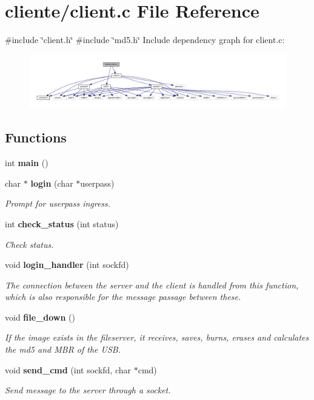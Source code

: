 \section{cliente/client.c File Reference}
\label{client_8c}
{\ttfamily \#include \char`\"{}client.\+h\char`\"{}}\newline
{\ttfamily \#include \char`\"{}md5.\+h\char`\"{}}\newline
Include dependency graph for client.\+c\+:
\nopagebreak
\begin{figure}[H]
\begin{center}
\leavevmode
\includegraphics[width=350pt]{client_8c__incl}
\end{center}
\end{figure}
\subsection*{Functions}
\begin{DoxyCompactItemize}
\item 
int \textbf{ main} ()
\item 
char $\ast$ \textbf{ login} (char $\ast$userpass)
\begin{DoxyCompactList}\small\item\em Prompt for userpass ingress. \end{DoxyCompactList}\item 
int \textbf{ check\+\_\+status} (int status)
\begin{DoxyCompactList}\small\item\em Check status. \end{DoxyCompactList}\item 
void \textbf{ login\+\_\+handler} (int sockfd)
\begin{DoxyCompactList}\small\item\em The connection between the server and the client is handled from this function, which is also responsible for the message passage between these. \end{DoxyCompactList}\item 
void \textbf{ file\+\_\+down} ()
\begin{DoxyCompactList}\small\item\em If the image exists in the fileserver, it receives, saves, burns, erases and calculates the md5 and M\+BR of the U\+SB. \end{DoxyCompactList}\item 
void \textbf{ send\+\_\+cmd} (int sockfd, char $\ast$cmd)
\begin{DoxyCompactList}\small\item\em Send message to the server through a socket. \end{DoxyCompactList}\end{DoxyCompactItemize}


